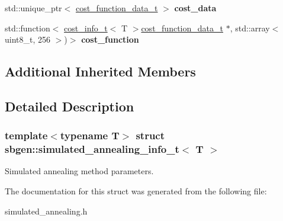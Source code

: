 \begin{DoxyCompactItemize}
std\+::unique\+\_\+ptr$<$ \hyperlink{classsbgen_1_1cost__function__data__t}{cost\+\_\+function\+\_\+data\+\_\+t} $>$ {\bfseries cost\+\_\+data}
\item 
\mbox{\label{structsbgen_1_1simulated__annealing__info__t_ad424d3ae517031530dc2d70ada977eb3}} 
std\+::function$<$ \hyperlink{structsbgen_1_1cost__info__t}{cost\+\_\+info\+\_\+t}$<$ T $>$\hyperlink{classsbgen_1_1cost__function__data__t}{cost\+\_\+function\+\_\+data\+\_\+t} $\ast$, std\+::array$<$ uint8\+\_\+t, 256 $>$)$>$ {\bfseries cost\+\_\+function}
\end{DoxyCompactItemize}
\subsection*{Additional Inherited Members}


\subsection{Detailed Description}
\subsubsection*{template$<$typename T$>$\newline
struct sbgen\+::simulated\+\_\+annealing\+\_\+info\+\_\+t$<$ T $>$}

Simulated annealing method parameters. 

The documentation for this struct was generated from the following file\+:\begin{DoxyCompactItemize}
\item 
simulated\+\_\+annealing.\+h\end{DoxyCompactItemize}
